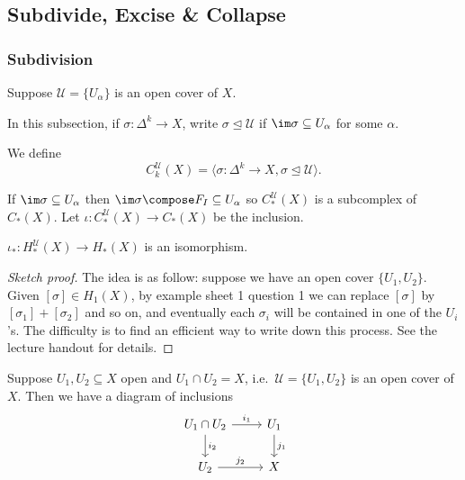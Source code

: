 \documentclass[a4paper]{article}
\begin{document}
\subsection{Subdivide, Excise \& Collapse}

\subsubsection{Subdivision}

Suppose \(\mathcal U = \{U_\alpha\}\) is an open cover of \(X\).

\begin{notation}
  In this subsection, if \(\sigma: \Delta^k \to X\), write \(\sigma \trianglelefteq \mathcal U\) if \(\im \sigma \subseteq U_\alpha\) for some \(\alpha\).
\end{notation}

\begin{definition}
  We define
  \[
    C_k^{\mathcal U} (X) = \langle \sigma: \Delta^k \to X, \sigma \trianglelefteq \mathcal U \rangle.
  \]
\end{definition}

If \(\im \sigma \subseteq U_\alpha\) then \(\im \sigma \compose F_I \subseteq U_\alpha\) so \(C_*^{\mathcal U}(X)\) is a subcomplex of \(C_*(X)\). Let \(\iota: C_*^{\mathcal U}(X) \to C_*(X)\) be the inclusion.

\begin{theorem}[subdivision]
  \(\iota_*: H_*^{\mathcal U}(X) \to H_*(X)\) is an isomorphism.
\end{theorem}

\begin{proof}[Sketch proof]
  The idea is as follow: suppose we have an open cover \(\{U_1, U_2\}\). Given \([\sigma] \in H_1(X)\), by example sheet 1 question 1 we can replace \([\sigma]\) by \([\sigma_1] + [\sigma_2]\) and so on, and eventually each \(\sigma_i\) will be contained in one of the \(U_i\)'s. The difficulty is to find an efficient way to write down this process. See the lecture handout for details.
\end{proof}

Suppose \(U_1, U_2 \subseteq X\) open and \(U_1 \cap U_2 = X\), i.e.\ \(\mathcal U = \{U_1, U_2\}\) is an open cover of \(X\). Then we have a diagram of inclusions
\[
  \begin{tikzcd}
    U_1 \cap U_2 \ar[r, "i_1"] \ar[d, "i_2"] & U_1 \ar[d, "j_1"] \\
    U_2 \ar[r, "j_2"] & X
  \end{tikzcd}
\]
\end{document}
